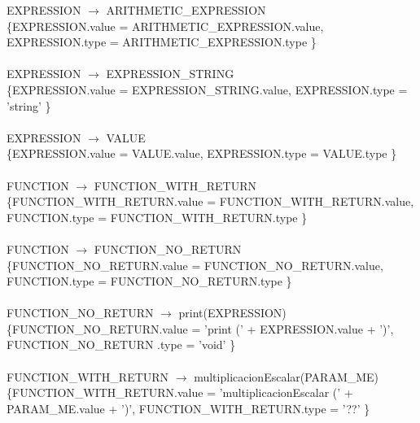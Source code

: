 \documentclass[10pt,a4paper]{article}
\begin{document}
{{{EXPRESSION $\rightarrow$ ARITHMETIC\_EXPRESSION \\   

\{EXPRESSION.value =  ARITHMETIC\_EXPRESSION.value, EXPRESSION.type = ARITHMETIC\_EXPRESSION.type  \}  \\ \\


EXPRESSION $\rightarrow$ EXPRESSION\_STRING   \\

\{EXPRESSION.value =  EXPRESSION\_STRING.value, EXPRESSION.type = 'string'  \}  \\ \\


EXPRESSION $\rightarrow$ VALUE \\

\{EXPRESSION.value =  VALUE.value, EXPRESSION.type = VALUE.type  \}  \\ \\



FUNCTION $\rightarrow$ FUNCTION\_WITH\_RETURN \\

\{FUNCTION\_WITH\_RETURN.value =  FUNCTION\_WITH\_RETURN.value, FUNCTION.type = FUNCTION\_WITH\_RETURN.type  \}  \\ \\


FUNCTION $\rightarrow$ FUNCTION\_NO\_RETURN \\

\{FUNCTION\_NO\_RETURN.value =  FUNCTION\_NO\_RETURN.value, FUNCTION.type = FUNCTION\_NO\_RETURN.type  \}  \\ \\



FUNCTION\_NO\_RETURN $\rightarrow$ print(EXPRESSION) \\   

\{FUNCTION\_NO\_RETURN.value =  'print (' + EXPRESSION.value + ')', FUNCTION\_NO\_RETURN .type = 'void'  \}  \\ \\


FUNCTION\_WITH\_RETURN $\rightarrow$ multiplicacionEscalar(PARAM\_ME) \\   

\{FUNCTION\_WITH\_RETURN.value =  'multiplicacionEscalar (' + PARAM\_ME.value + ')', FUNCTION\_WITH\_RETURN.type = '??'  \}  \\ \\


}}}
\end{document}
